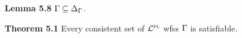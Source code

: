 \documentclass[a4paper, 11pt]{article} %
\begin{document}
\begin{enumerate}
  \item[\bf Lemma 5.8] $\Gamma\subseteq\Delta_{\Gamma}$.
  \item[\bf Theorem 5.1] Every consistent set of $\mathcal{L}^{\textsc{pl}}$ wfss $\Gamma$ is satisfiable.
\end{enumerate}






%
\end{document}

